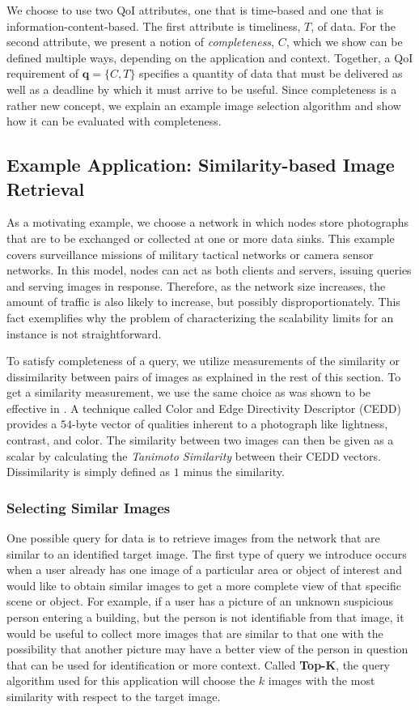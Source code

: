 We choose to use two QoI attributes, one that is time-based and one that is information-content-based.  The first attribute is timeliness, $T$, of data.  For the second attribute, we present a notion of \emph{completeness}, $C$, which we show can be defined multiple ways, depending on the application and context.  Together, a QoI requirement of $\mathbf{q} = \{C,T\}$ specifies a quantity of data that must be delivered as well as a deadline by which it must arrive to be useful.  Since completeness is a rather new concept, we explain an example image selection algorithm and show how it can be evaluated with completeness.

\subsection{Example Application: Similarity-based Image Retrieval}

As a motivating example, we choose a network in which nodes store photographs that are to be exchanged or collected at one or more data sinks.  This example covers surveillance missions of military tactical networks or camera sensor networks.  In this model, nodes can act as both clients and servers, issuing queries and serving images in response.  Therefore, as the network size increases, the amount of traffic is also likely to increase, but possibly disproportionately.  This fact exemplifies why the problem of characterizing the scalability limits for an instance is not straightforward.

To satisfy completeness of a query, we utilize measurements of the similarity or dissimilarity between pairs of images as explained in the rest of this section.  To get a similarity measurement, we use the same choice as was shown to be effective in \cite{mediascope}.  A technique called Color and Edge Directivity Descriptor (CEDD) \cite{2008cedd} provides a $54$-byte vector of qualities inherent to a photograph like lightness, contrast, and color.  The similarity between two images can then be given as a scalar by calculating the \emph{Tanimoto Similarity} \cite{tanimoto} between their CEDD vectors.  Dissimilarity is simply defined as $1$ minus the similarity.

\subsubsection{Selecting Similar Images}
One possible query for data is to retrieve images from the network that are similar to an identified target image.
The first type of query we introduce occurs when a user already has one image of a particular area or object of interest and would like to obtain similar images to get a more complete view of that specific scene or object.  
For example, if a user has a picture of an unknown suspicious person entering a building, but the person is not identifiable from that image, it would be useful to collect more images that are similar to that one with the possibility that another picture may have a better view of the person in question that can be used for identification or more context.  Called {\bf Top-K}, the query algorithm used for this application will choose the $k$ images with the most similarity with respect to the target image.  

